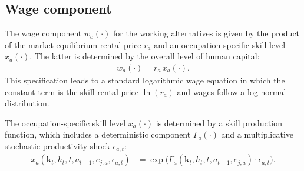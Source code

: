 \subsection{Wage component}
The wage component $w_{a}(\cdot)$ for the working alternatives is given by the product of the market-equilibrium rental price $r_{a}$ and an occupation-specific skill level $x_{a}(\cdot)$. The latter is determined by the overall level of human capital:
%
\begin{align*}
w_{a}(\cdot) = r_{a} \, x_{a}(\cdot).
\end{align*}
%
This specification leads to a standard logarithmic wage equation in which the constant term is the skill rental price $\ln(r_{a})$ and wages follow a log-normal distribution.

The occupation-specific skill level $x_{a}(\cdot)$ is determined by a skill production function, which includes a deterministic component $\Gamma_a(\cdot)$ and a multiplicative stochastic productivity shock $\epsilon_{a,t}$:
%
\begin{align}
    x_{a}(\bm{k}_t, h_t, t, a_{t-1}, e_{j, a}, \epsilon_{a,t}) & = \exp \big( \Gamma_{a}(\bm{k}_t,  h_t, t, a_{t-1}, e_{j,a}) \cdot \epsilon_{a,t} \big). \nonumber
\end{align}
